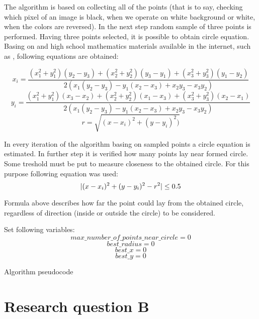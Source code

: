 \documentclass[notitlepage,english]{hgbreport}
\DeclarePairedDelimiter{\abs}{\lvert}{\rvert}
\begin{document}
The algorithm is based on collecting all of the points (that is to say, checking which pixel of an image is black, when we operate on white background or white, when the colors are reversed). In the next step random sample of three points is performed. Having three points selected,  it is possible to obtain circle equation. Basing on \cite{wiki:Circles} and high school mathematics materials available in the internet, such as \cite{eisle}, following equations are obtained:

\[x_{i}=\frac{(x_{1}^2+y_{1}^2)(y_{2}-y_{3})+(x_{2}^2+y_{2}^2)(y_{3}-y_{1})+(x_{3}^2+y_{3}^2)(y_{1}-y_{2})}{2(x_{1}(y_{2}-y_{3})-y_{1}(x_{2}-x_{3})+x_{2}y_{3}-x_{3}y_{2})}\]
\[y_{i}=\frac{(x_{1}^2+y_{1}^2)(x_{3}-x_{2})+(x_{2}^2+y_{2}^2)(x_{1}-x_{3})+(x_{3}^2+y_{3}^2)(x_{2}-x_{1})} {2(x_{1}(y_{2}-y_{3})-y_{1}(x_{2}-x_{3})+x_{2}y_{3}-x_{3}y_{2})}\]
\[r=\sqrt{(x-x_{i})^2+(y-y_{i})^2)}\]

In every iteration of the algorithm basing on sampled points a circle equation is estimated. In further step it is verified how many points lay near formed circle. Some treshold must be put to measure closeness to the obtained circle. For this purpose following equation was used:
\[\abs{(x-x_{i})^2+(y-y_{i})^2-r^2}\le0.5\]			

Formula above  describes how far the point could lay from the obtained circle, regardless of direction (inside or outside the circle) to be considered.

\begin{algorithm}[H]
\SetAlgoLined
{}
 Set following variables:
\[max\_number\_of\_points\_near\_circle=0\] 
 \[best\_radius=0\] 
 \[best\_x=0\] 
 \[best\_y=0\] 
 \caption{Algorithm pseudocode}
\end{algorithm}





\section {Research question B}
\end{document}
